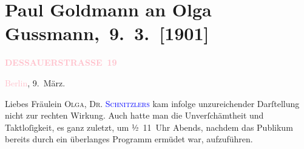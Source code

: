 

\renewcommand{\erwaehntePersonen}{Personen: Paul Goldmann, Paul Lindau, Paul Marx, Olga Schnitzler, Elisabeth Steinrück}
\renewcommand{\erwaehnteInstitutionen}{Institutionen: Berliner Theater, Konservatorium der Gesellschaft der Musikfreunde}
\renewcommand{\erwaehnteOrte}{Orte: Berlin, Dessauer Straße, Wien, Überbrettl}
\renewcommand{\erwaehnteWerke}{Werke: Marionetten. Drei Einakter, Tagebuch, Zum großen Wurstel. Burleske in einem Akt, [Portraitfoto von Olga Gussmann]}
\section[ Paul Goldmann an Olga Gussmann, 9. 3. {[}1901{]}]{Paul Goldmann an Olga Gussmann, 9. 3. {[}1901{]}}
\nopagebreak{}
\rehead{ }\normalsize\beginnumbering{}
\toendnotes[C]{\smallbreak\pagebreak[2]}
\toendnotes[C]{\smallbreak}
\pstart
           \noindent{}\raggedleft{}{\pb}\textcolor{gray}{\textbf{\textcolor{pink}{DESSAUERSTRASSE 19}{}\ledrightnote{\textcolor{pink}{Dessauer Straße}}}}\pend
           
\pstart
           \textcolor{pink}{Berlin}{}\ledrightnote{\textcolor{pink}{Berlin}}, 9. März.\pend
           
\pstart\center{}Liebes Fräulein \textsc{Olga},\pend
\pstart
           \textsc{Dr. \textcolor{blue}{Schnitzlers}{}\ledrightnote{}}{ }\label{K_L03526-1v}\label{K_L03526-1h} kam infolge unzureichender Darſtellung nicht zur rechten
               Wirkung. Auch hatte man die Unverſchämtheit und Taktloſigkeit, es ganz zuletzt, um
                  \strikeout{\textcolor{gray}{½}}{ }½ 11 Uhr Abends, nachdem das Publikum bereits durch ein überlanges
               Programm ermüdet war, aufzuführen.\pend
           
